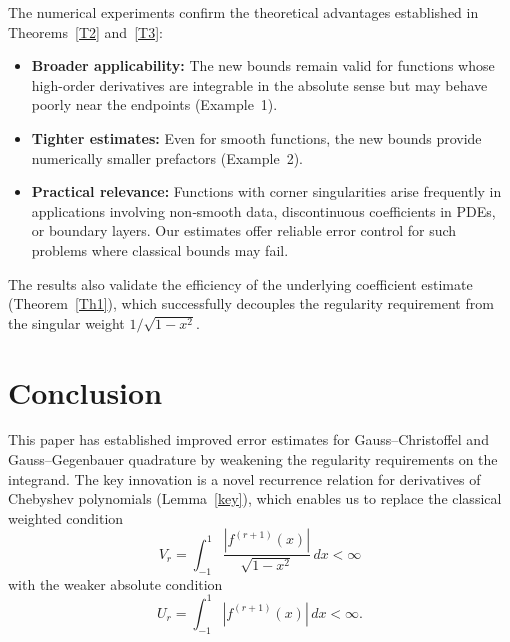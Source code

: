 \documentclass[12pt,a4paper]{article}
\begin{document}
The numerical experiments confirm the theoretical advantages established in Theorems~\ref{T2} and~\ref{T3}:
\begin{itemize}
    \item \textbf{Broader applicability:} The new bounds remain valid for functions whose high-order derivatives are integrable in the absolute sense but may behave poorly near the endpoints (Example~1).
    \item \textbf{Tighter estimates:} Even for smooth functions, the new bounds provide numerically smaller prefactors (Example~2).
    \item \textbf{Practical relevance:} Functions with corner singularities arise frequently in applications involving non‑smooth data, discontinuous coefficients in PDEs, or boundary layers. Our estimates offer reliable error control for such problems where classical bounds may fail.
\end{itemize}

The results also validate the efficiency of the underlying coefficient estimate (Theorem~\ref{Th1}), which successfully decouples the regularity requirement from the singular weight $1/\sqrt{1-x^2}$.

\section{Conclusion}\label{sec:conclusion}

This paper has established improved error estimates for Gauss--Christoffel and Gauss--Gegenbauer quadrature by weakening the regularity requirements on the integrand. The key innovation is a novel recurrence relation for derivatives of Chebyshev polynomials (Lemma~\ref{key}), which enables us to replace the classical weighted condition
\[
V_r = \int_{-1}^{1} \frac{|f^{(r+1)}(x)|}{\sqrt{1-x^2}}\,dx < \infty
\]
with the weaker absolute condition
\[
U_r = \int_{-1}^{1} |f^{(r+1)}(x)|\,dx < \infty.
\]
\end{document}
